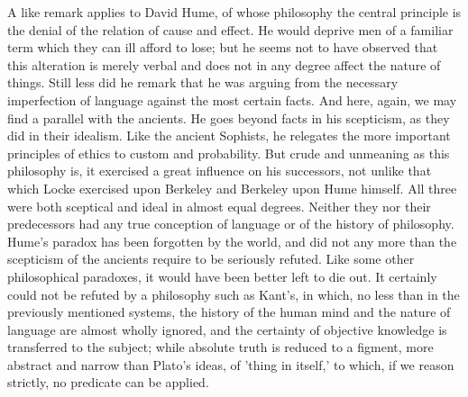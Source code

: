\documentclass[11pt,letter]{article}
\begin{document}
\par  A like remark applies to David Hume, of whose philosophy the central principle is the denial of the relation of cause and effect. He would deprive men of a familiar term which they can ill afford to lose; but he seems not to have observed that this alteration is merely verbal and does not in any degree affect the nature of things. Still less did he remark that he was arguing from the necessary imperfection of language against the most certain facts. And here, again, we may find a parallel with the ancients. He goes beyond facts in his scepticism, as they did in their idealism. Like the ancient Sophists, he relegates the more important principles of ethics to custom and probability. But crude and unmeaning as this philosophy is, it exercised a great influence on his successors, not unlike that which Locke exercised upon Berkeley and Berkeley upon Hume himself. All three were both sceptical and ideal in almost equal degrees. Neither they nor their predecessors had any true conception of language or of the history of philosophy. Hume's paradox has been forgotten by the world, and did not any more than the scepticism of the ancients require to be seriously refuted. Like some other philosophical paradoxes, it would have been better left to die out. It certainly could not be refuted by a philosophy such as Kant's, in which, no less than in the previously mentioned systems, the history of the human mind and the nature of language are almost wholly ignored, and the certainty of objective knowledge is transferred to the subject; while absolute truth is reduced to a figment, more abstract and narrow than Plato's ideas, of 'thing in itself,' to which, if we reason strictly, no predicate can be applied.
\end{document}
